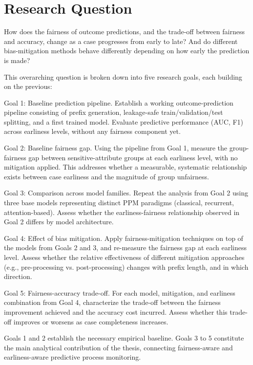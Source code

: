 \documentclass[authoryear,preprint,12pt]{elsarticle}
\begin{document}
\section{Research Question}

How does the fairness of outcome predictions, and the trade-off between fairness and accuracy, change as a case progresses from early to late? And do different bias-mitigation methods behave differently depending on how early the prediction is made?

This overarching question is broken down into five research goals, each building on the previous:

Goal 1: Baseline prediction pipeline. Establish a working outcome-prediction pipeline consisting of prefix generation, leakage-safe train/validation/test splitting, and a first trained model. Evaluate predictive performance (AUC, F1) across earliness levels, without any fairness component yet.

Goal 2: Baseline fairness gap. Using the pipeline from Goal 1, measure the group-fairness gap between sensitive-attribute groups at each earliness level, with no mitigation applied. This addresses whether a measurable, systematic relationship exists between case earliness and the magnitude of group unfairness.

Goal 3: Comparison across model families. Repeat the analysis from Goal 2 using three base models representing distinct PPM paradigms (classical, recurrent, attention-based). Assess whether the earliness-fairness relationship observed in Goal 2 differs by model architecture.

Goal 4: Effect of bias mitigation. Apply fairness-mitigation techniques on top of the models from Goals 2 and 3, and re-measure the fairness gap at each earliness level. Assess whether the relative effectiveness of different mitigation approaches (e.g., pre-processing vs. post-processing) changes with prefix length, and in which direction.

Goal 5: Fairness-accuracy trade-off. For each model, mitigation, and earliness combination from Goal 4, characterize the trade-off between the fairness improvement achieved and the accuracy cost incurred. Assess whether this trade-off improves or worsens as case completeness increases.

Goals 1 and 2 establish the necessary empirical baseline. Goals 3 to 5 constitute the main analytical contribution of the thesis, connecting fairness-aware and earliness-aware predictive process monitoring.
\end{document}

